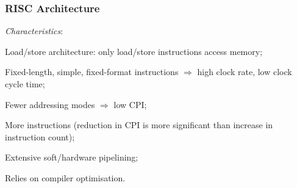 \subsubsection*{RISC Architecture}
\emph{Characteristics}: \begin{enuminline}
    \item Load/store architecture: only load/store instructions access memory;
    \item Fixed-length, simple, fixed-format instructions $\Rightarrow$ high clock rate, low clock cycle time;
    \item Fewer addressing modes $\Rightarrow$ low CPI;
    \item More instructions (reduction in CPI is more significant than increase in instruction count);
    \item Extensive soft/hardware pipelining;
    \item Relies on compiler optimisation.
\end{enuminline}